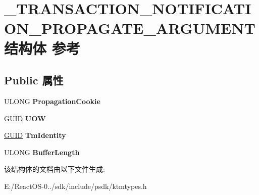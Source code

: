 \hypertarget{struct___t_r_a_n_s_a_c_t_i_o_n___n_o_t_i_f_i_c_a_t_i_o_n___p_r_o_p_a_g_a_t_e___a_r_g_u_m_e_n_t}{}\section{\+\_\+\+T\+R\+A\+N\+S\+A\+C\+T\+I\+O\+N\+\_\+\+N\+O\+T\+I\+F\+I\+C\+A\+T\+I\+O\+N\+\_\+\+P\+R\+O\+P\+A\+G\+A\+T\+E\+\_\+\+A\+R\+G\+U\+M\+E\+N\+T结构体 参考}
\label{struct___t_r_a_n_s_a_c_t_i_o_n___n_o_t_i_f_i_c_a_t_i_o_n___p_r_o_p_a_g_a_t_e___a_r_g_u_m_e_n_t}
\subsection*{Public 属性}
\begin{DoxyCompactItemize}
\item 
\mbox{\label{struct___t_r_a_n_s_a_c_t_i_o_n___n_o_t_i_f_i_c_a_t_i_o_n___p_r_o_p_a_g_a_t_e___a_r_g_u_m_e_n_t_a7f64502ab568f763f98887990b3d85e7}} 
U\+L\+O\+NG {\bfseries Propagation\+Cookie}
\item 
\mbox{\label{struct___t_r_a_n_s_a_c_t_i_o_n___n_o_t_i_f_i_c_a_t_i_o_n___p_r_o_p_a_g_a_t_e___a_r_g_u_m_e_n_t_a96a4257fe53c139272b30e4adf2f5806}} 
\hyperlink{interface_g_u_i_d}{G\+U\+ID} {\bfseries U\+OW}
\item 
\mbox{\label{struct___t_r_a_n_s_a_c_t_i_o_n___n_o_t_i_f_i_c_a_t_i_o_n___p_r_o_p_a_g_a_t_e___a_r_g_u_m_e_n_t_a17b89c5da4f08491f60fc4a5c109bc6f}} 
\hyperlink{interface_g_u_i_d}{G\+U\+ID} {\bfseries Tm\+Identity}
\item 
\mbox{\label{struct___t_r_a_n_s_a_c_t_i_o_n___n_o_t_i_f_i_c_a_t_i_o_n___p_r_o_p_a_g_a_t_e___a_r_g_u_m_e_n_t_a6cfd45c7368720013be7219e53884f2e}} 
U\+L\+O\+NG {\bfseries Buffer\+Length}
\end{DoxyCompactItemize}


该结构体的文档由以下文件生成\+:\begin{DoxyCompactItemize}
\item 
E\+:/\+React\+O\+S-\/0../sdk/include/psdk/ktmtypes.\+h\end{DoxyCompactItemize}
